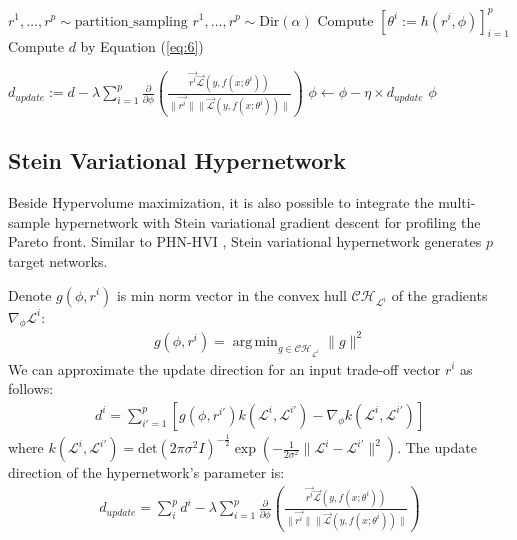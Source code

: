 \documentclass[letterpaper]{article} %
\DeclareMathOperator*{\argmin}{arg\,min}
\newcommand{\ourmodel}{PHN-HVI }
\begin{document}
\begin{algorithm}
\caption{\ourmodel optimization algorithm}
\begin{algorithmic}[1]
\STATE $r^1, \dots, r^p \sim \text{partition\_sampling}$
\ELSE
\STATE $r^1, \dots, r^p \sim \text{Dir}(\alpha)$
\ENDIF
\STATE Compute $\left[\theta^{i} := h(r^i, \phi)\right]_{i=1}^p$ %
\STATE Compute $d$ by Equation (\ref{eq:6})

\STATE $d_{update} := d - \lambda\sum_{i=1}^p \frac{\partial}{\partial \phi}\left( \frac{\vec{r^i}\vec{\mathcal{L}}(y, f\left(x; \theta^{i} \right))}{\|\vec{r^i}\|\|\vec{\mathcal{L}}(y, f\left(x; \theta^{i} \right))\|}\right) $
\STATE $\phi \xleftarrow{} \phi - \eta \times d_{update} $
\ENDWHILE
\RETURN $\phi$
\end{algorithmic}
\label{alg:1}
\end{algorithm}

\subsection{Stein Variational Hypernetwork}
Beside Hypervolume maximization, it is also possible to integrate the multi-sample hypernetwork with Stein variational gradient descent \cite{moosvgd} for profiling the Pareto front. Similar to \ourmodel, Stein variational hypernetwork generates $p$ target networks.

Denote $g(\phi, r^i)$ is min norm vector in the convex hull $\mathcal{CH}_{\mathcal{L}^i}$ of the gradients $\nabla_{\phi}\mathcal{L}^i$:
\begin{align}
    g(\phi, r^i) = \argmin_{g \in \mathcal{CH}_{\mathcal{L}^i}} \|g\|^2
\end{align}
We can approximate the update direction for an input trade-off vector $r^i$ as follows:
\begin{align}
    d^i = \sum_{i'=1}^p \left[ g(\phi, r^{i'}) k(\mathcal{L}^i, \mathcal{L}^{i'}) - \nabla_{\phi}k(\mathcal{L}^i, \mathcal{L}^{i'}) \right]
\end{align}
where $k(\mathcal{L}^i, \mathcal{L}^{i'})=\text{det}(2\pi \sigma^2I)^{-\frac{1}{2}}\exp(-\frac{1}{2\sigma^2}\|\mathcal{L}^i-\mathcal{L}^{i'}\|^2)$.
The update direction of the hypernetwork's parameter is:
\begin{align}
    d_{update} = \sum_i^p d^i - \lambda\sum_{i=1}^p \frac{\partial}{\partial \phi}\left( \frac{\vec{r^i}\vec{\mathcal{L}}(y, f\left(x; \theta^{i} \right))}{\|\vec{r^i}\|\|\vec{\mathcal{L}}(y, f\left(x; \theta^{i} \right))\|}\right)
\end{align}
\end{document}
